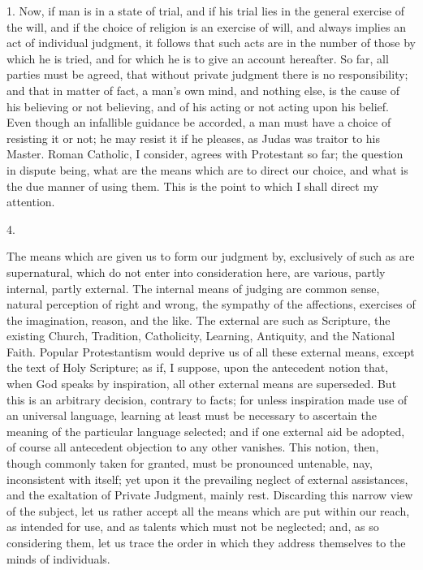 1. Now, if man is in a state of trial, and if his trial lies in the
general exercise of the will, and if the choice of religion is an
exercise of will, and always implies an act of individual judgment, it
follows that such acts are in the number of those by which he is
tried, and for which he is to give an account hereafter. So far, all
parties must be agreed, that without private judgment there is no
responsibility; and that in matter of fact, a man's own mind, and
nothing else, is the cause of his believing or not believing, and of
his acting or not acting upon his belief. Even though an infallible
guidance be accorded, a man must have a choice of resisting it or not;
he may resist it if he pleases, as Judas was traitor to his
Master. Roman Catholic, I consider, agrees with Protestant so far; the
question in dispute being, what are the means which are to direct our
choice, and what is the due manner of using them. This is the point to
which I shall direct my attention.

4.

The means which are given us to form our judgment by, exclusively
of such as are supernatural, which do not enter into consideration
here, are various, partly internal, partly external. The internal
means of judging are common sense, natural perception of right and
wrong, the sympathy of the affections, exercises of the imagination,
reason, and the like. The external are such as Scripture, the existing
Church, Tradition, Catholicity, Learning, Antiquity, and the National
Faith. Popular Protestantism would deprive us of all these external
means, except the text of Holy Scripture; as if, I suppose, upon the
antecedent notion that, when God speaks by inspiration, all other
external means are superseded. But this is an arbitrary decision,
contrary to facts; for unless inspiration made use of an universal
language, learning at least must be necessary to ascertain the meaning
of the particular language selected; and if one external aid be
adopted, of course all antecedent objection to any other vanishes.
This notion, then, though commonly taken for granted, must be
pronounced untenable, nay, inconsistent with itself; yet upon it the
prevailing neglect of external assistances, and the exaltation of
Private Judgment, mainly rest. Discarding this narrow view of the
subject, let us rather accept all the means which are put within our
reach, as intended for use, and as talents which must not be
neglected; and, as so considering them, let us trace the order in
which they address themselves to the minds of individuals.

